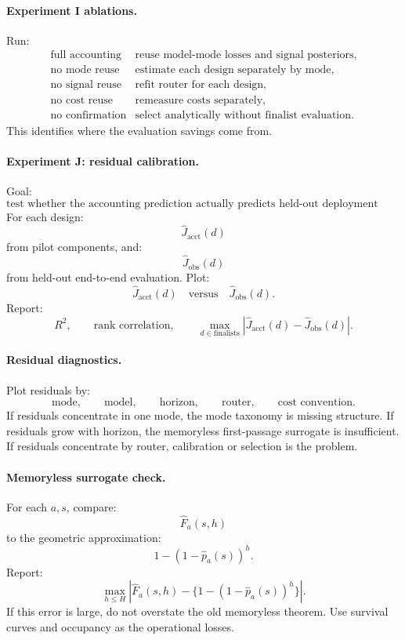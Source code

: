 \documentclass{article}
\begin{document}
\paragraph{Experiment I ablations.}
Run:
\[
\begin{array}{ll}
    \text{full accounting} & \text{reuse model-mode losses and signal posteriors},\\
    \text{no mode reuse} & \text{estimate each design separately by mode},\\
    \text{no signal reuse} & \text{refit router for each design},\\
    \text{no cost reuse} & \text{remeasure costs separately},\\
    \text{no confirmation} & \text{select analytically without finalist evaluation}.
\end{array}
\]
This identifies where the evaluation savings come from.

\paragraph{Experiment J: residual calibration.}
Goal:
\[
    \text{test whether the accounting prediction actually predicts held-out deployment loss.}
\]
For each design:
\[
    \hat J_{\mathrm{acct}}(d)
\]
from pilot components, and:
\[
    \hat J_{\mathrm{obs}}(d)
\]
from held-out end-to-end evaluation.
Plot:
\[
    \hat J_{\mathrm{acct}}(d)
    \quad\text{versus}\quad
    \hat J_{\mathrm{obs}}(d).
\]
Report:
\[
    R^2,
    \qquad
    \text{rank correlation},
    \qquad
    \max_{d\in\mathrm{finalists}}|\hat J_{\mathrm{acct}}(d)-\hat J_{\mathrm{obs}}(d)|.
\]

\paragraph{Residual diagnostics.}
Plot residuals by:
\[
    \text{mode},
    \qquad
    \text{model},
    \qquad
    \text{horizon},
    \qquad
    \text{router},
    \qquad
    \text{cost convention}.
\]
If residuals concentrate in one mode, the mode taxonomy is missing structure.
If residuals grow with horizon, the memoryless first-passage surrogate is insufficient.
If residuals concentrate by router, calibration or selection is the problem.

\paragraph{Memoryless surrogate check.}
For each \(a,s\), compare:
\[
    \hat F_a(s,h)
\]
to the geometric approximation:
\[
    1-(1-\hat p_a(s))^h.
\]
Report:
\[
    \max_{h\le H}
    \left|
    \hat F_a(s,h)-\{1-(1-\hat p_a(s))^h\}
    \right|.
\]
If this error is large, do not overstate the old memoryless theorem.
Use survival curves and occupancy as the operational losses.
\end{document}
